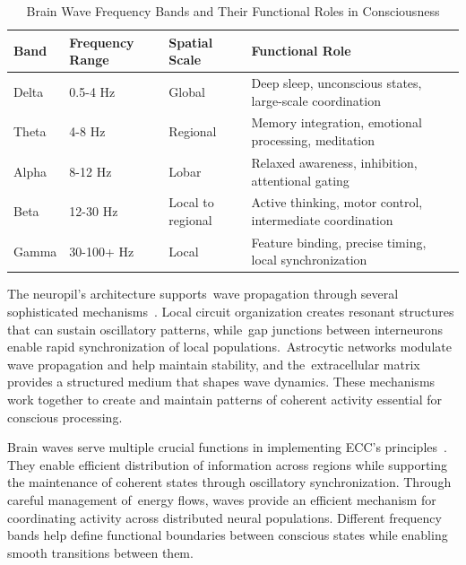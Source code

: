 
\begin{table}[h]
\centering
\caption{Brain Wave Frequency Bands and Their Functional Roles in Consciousness}
\label{tab:brain_waves}
\begin{tabular}{|l|l|l|l|}
\hline
\textbf{Band} & \textbf{Frequency Range} & \textbf{Spatial Scale} & \textbf{Functional Role} \\
\hline
Delta & 0.5-4 Hz & Global & Deep sleep, unconscious states, large-scale coordination \\
\hline
Theta & 4-8 Hz & Regional & Memory integration, emotional processing, meditation \\
\hline
Alpha & 8-12 Hz & Lobar & Relaxed awareness, inhibition, attentional gating \\
\hline
Beta & 12-30 Hz & Local to regional & Active thinking, motor control, intermediate coordination \\
\hline
Gamma & 30-100+ Hz & Local & Feature binding, precise timing, local synchronization \\
\hline
\end{tabular}
\end{table}


The neuropil's architecture supports~wave propagation through several sophisticated mechanisms~\cite{Buzsaki2006, pinotsis2023cytoelectric}. Local circuit organization creates resonant structures that can sustain oscillatory patterns, while~gap junctions between interneurons enable rapid synchronization of local populations.~Astrocytic networks modulate wave propagation and help maintain stability, and the~extracellular matrix provides a structured medium that shapes wave dynamics. These mechanisms work together to create and maintain patterns of coherent activity essential for conscious processing.

Brain waves serve multiple crucial functions in implementing ECC's principles~\cite{Varela2001, Fries2015}. They enable efficient distribution of information across regions while supporting the maintenance of coherent states through oscillatory synchronization. Through careful management of~energy flows, waves provide an efficient mechanism for coordinating activity across distributed neural populations. Different frequency bands help define functional boundaries between conscious states while enabling smooth transitions between them.

